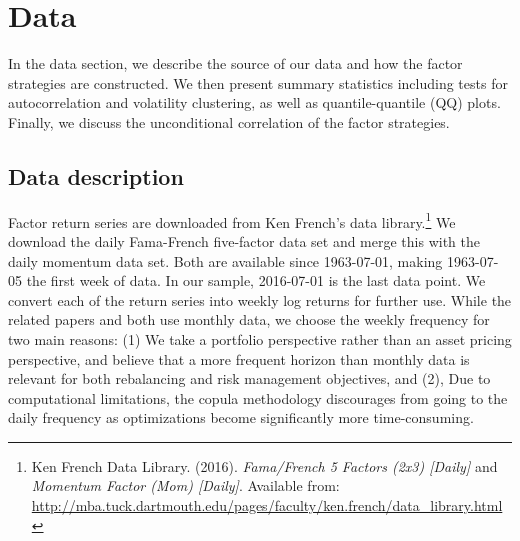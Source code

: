 \section{Data}
\label{sec:data}
In the data section, we describe the source of our data and how the factor strategies are constructed. We then present summary statistics including tests for autocorrelation and volatility clustering, as well as quantile-quantile (QQ) plots. Finally, we discuss the unconditional correlation of the factor strategies.

\subsection{Data description}

Factor return series are downloaded from Ken French's data library.\footnote{Ken French Data Library. (2016). \textit{Fama/French 5 Factors (2x3) [Daily]} and \textit{Momentum Factor (Mom) [Daily]}. Available from: \url{http://mba.tuck.dartmouth.edu/pages/faculty/ken.french/data_library.html}} We download the daily Fama-French five-factor data set and merge this with the daily momentum data set. Both are available since 1963-07-01, making 1963-07-05 the first week of data. In our sample, 2016-07-01 is the last data point. We convert each of the return series into weekly log returns for further use. While the related papers \textcite{FF2015} and \textcite{Asness2015} both use monthly data, we choose the weekly frequency for two main reasons: (1) We take a portfolio perspective rather than an asset pricing perspective, and believe that a more frequent horizon than monthly data is relevant for both rebalancing and risk management objectives, and (2), Due to computational limitations, the copula methodology discourages from going to the daily frequency as optimizations become significantly more time-consuming.


